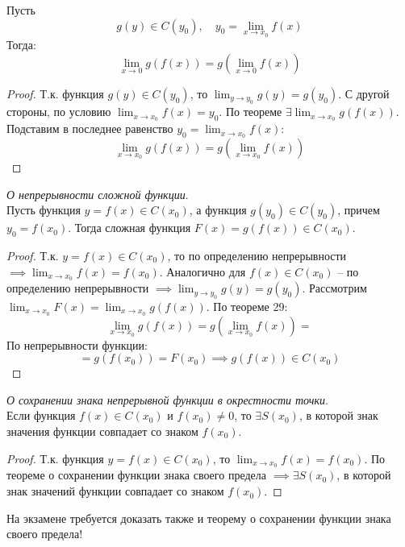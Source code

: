 \begin{theorem}
  Пусть \[
    g(y) \in C(y_0), \quad y_0 = \lim_{x \to x_0} f(x)
  \]
  Тогда: \[
    \lim_{x \to 0} g(f(x)) = g(\lim_{x \to 0} f(x))
  \]
\end{theorem}
\begin{proof}
  Т.к. функция $g\left( y \right) \in C(y_0)$, то $\lim_{y \to y_0} g(y) = g(y_0)$.
  С другой стороны, по условию $\lim_{x \to x_0} f(x) = y_0$.
  По теореме  $\exists \lim_{x \to x_0} g(f(x))$.
  Подставим в последнее равенство $y_0 = \lim_{x \to x_0} f(x)$: \[
    \lim_{x \to x_0} g(f(x)) = g(\lim_{x \to x_0} f(x))
  \]  
\end{proof}

\begin{theorem}
 \textit{О непрерывности сложной функции}. \\
  Пусть функция $y = f(x) \in C(x_0)$, а функция $g(y_0) \in C(y_0)$, причем $y_0 = f(x_0)$.
  Тогда сложная функция $F(x) = g(f(x)) \in C(x_0)$.
\end{theorem}
\begin{proof}
  Т.к. $y = f(x) \in C(x_0)$, то по определению непрерывности $\implies \lim_{x \to x_0} f(x) = f(x_0)$. 
  Аналогично для $f(x) \in C(x_0)$ -- по определению непрерывности $\implies \lim_{y \to y_0} g(y) = g(y_0)$. 
  Рассмотрим $\lim_{x \to x_0} F(x) = \lim_{x \to x_0} g(f(x))$.
  По теореме 29: \[
    \lim_{x \to x_0} g(f(x)) = g(\lim_{x \to x_0} f(x)) = 
  \] 
  По непрерывности функции: \[
    = g(f(x_0)) = F(x_0) \implies g(f(x)) \in C(x_0)
  \] 
\end{proof}

\begin{theorem}
  \textit{О сохранении знака непрерывной функции в окрестности точки}. \\
  Если функция $f(x) \in C(x_0)$ и $f(x_0) \neq 0$, то $\exists S(x_0)$, в которой знак значения функции совпадает со знаком $f(x_0)$.
\end{theorem}
\begin{proof}
  Т.к. функция $y = f(x) \in C(x_0)$, то $\lim_{x \to x_0} f(x) = f(x_0)$. 
  По теореме о сохранении функции знака своего предела $\implies \exists S(x_0)$, в которой знак значений функции совпадает со знаком $f(x_0)$.
\end{proof}
\begin{note}
  На экзамене требуется доказать также и теорему о сохранении функции знака своего предела!
\end{note}


